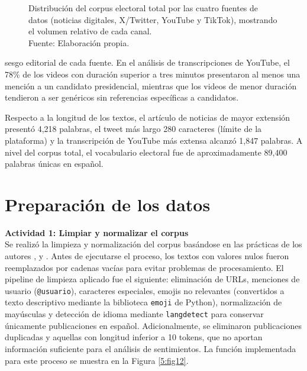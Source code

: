 \begin{figure}[!ht]
    \begin{center}
        \resizebox{0.85\textwidth}{!}{}
        \caption[Distribución del corpus electoral total por fuente de datos]{Distribución del corpus electoral total por las cuatro fuentes de datos (noticias digitales, X/Twitter, YouTube y TikTok), mostrando el volumen relativo de cada canal.\\Fuente: Elaboración propia.}
        \label{5:fig7}
    \end{center}
\end{figure}
sesgo editorial de cada fuente.
En el análisis de transcripciones de YouTube, el 78\% de los videos con duración
superior a tres minutos presentaron al menos una mención a un candidato presidencial,
mientras que los videos de menor duración tendieron a ser genéricos sin referencias
específicas a candidatos.

Respecto a la longitud de los textos, el artículo de noticias de mayor extensión
presentó 4,218 palabras, el tweet más largo 280 caracteres (límite de la plataforma) y
la transcripción de YouTube más extensa alcanzó 1,847 palabras. A nivel del corpus total,
el vocabulario electoral fue de aproximadamente 89,400 palabras únicas en español.

\section{Preparación de los datos}

\textbf{Actividad 1: Limpiar y normalizar el corpus}
\\
Se realizó la limpieza y normalización del corpus basándose en las prácticas de los
autores \cite{pr_alvi2023twitter_election_review}, \cite{pr_mendonca2025bertopic_political}
y \cite{pr_alvarez2023llm_political}. Antes de ejecutarse el proceso, los textos con
valores nulos fueron reemplazados por cadenas vacías para evitar problemas de
procesamiento. El pipeline de limpieza aplicado fue el siguiente: eliminación de URLs,
menciones de usuario (\texttt{@usuario}), caracteres especiales, emojis no relevantes
(convertidos a texto descriptivo mediante la biblioteca \texttt{emoji} de Python),
normalización de mayúsculas y detección de idioma mediante \texttt{langdetect}
para conservar únicamente publicaciones en español. Adicionalmente, se eliminaron
publicaciones duplicadas y aquellas con longitud inferior a 10 tokens, que no aportan
información suficiente para el análisis de sentimientos. La función implementada
para este proceso se muestra en la Figura \ref{5:fig12}.

